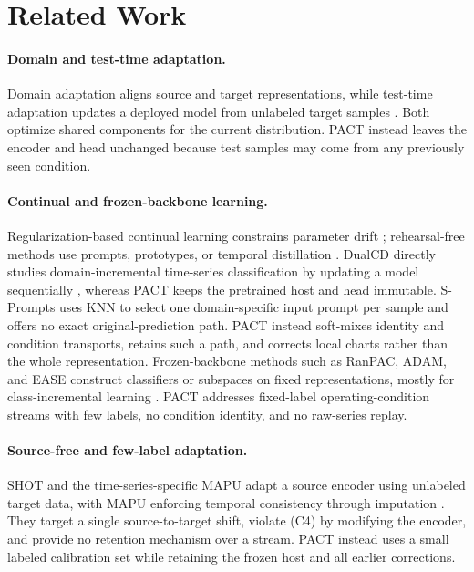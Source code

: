 \documentclass[letterpaper]{article} %
\begin{document}
\section{Related Work}
\label{sec:related}

\paragraph{Domain and test-time adaptation.}
Domain adaptation aligns source and target representations, while test-time
adaptation updates a deployed model from unlabeled target samples
\citep{dann,mmda,msda,tent,cotta,ecotta,eata}. Both optimize shared components
for the current distribution. PACT instead leaves the encoder and head
unchanged because test samples may come from any previously seen condition.

\paragraph{Continual and frozen-backbone learning.}
Regularization-based continual learning constrains parameter drift
\citep{ewc,mas,si,lwf}; rehearsal-free methods use prompts, prototypes, or
temporal distillation \citep{dualprompt,sprompts,dualcp,dt2w}. DualCD directly
studies domain-incremental time-series classification by updating a model
sequentially \citep{dualcd}, whereas PACT keeps the pretrained host and head
immutable. S-Prompts uses KNN to select one domain-specific input prompt per
sample and offers no exact original-prediction path. PACT instead soft-mixes
identity and condition transports, retains such a path, and corrects local
charts rather than the whole representation. Frozen-backbone methods such as
RanPAC, ADAM, and EASE construct classifiers or subspaces on fixed
representations, mostly for class-incremental learning
\citep{ranpac,adam,ease}. PACT addresses fixed-label operating-condition
streams with few labels, no condition identity, and no raw-series replay.

\paragraph{Source-free and few-label adaptation.}
SHOT and the time-series-specific MAPU adapt a source encoder using unlabeled
target data, with MAPU enforcing temporal consistency through imputation
\citep{shot,mapu}. They target a single source-to-target shift, violate (C4) by
modifying the encoder, and provide no retention mechanism over a stream. PACT
instead uses a small labeled calibration set while retaining the frozen host
and all earlier corrections.
\end{document}
